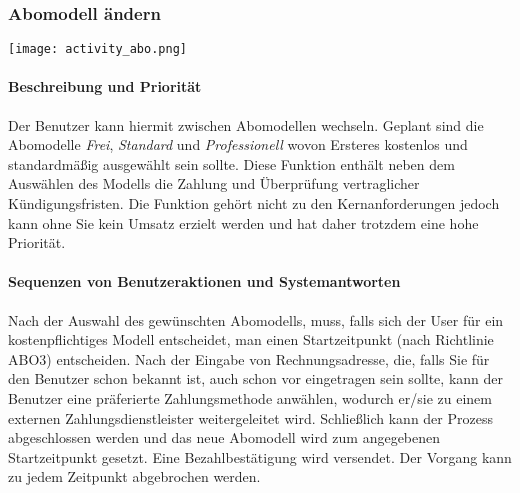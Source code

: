 \subsubsection{Abomodell ändern}
\texttt{[image: activity\_abo.png]}


\paragraph{Beschreibung und Priorität}
Der Benutzer kann hiermit zwischen Abomodellen wechseln. Geplant sind die Abomodelle \textit{Frei}, \textit{Standard} und \textit{Professionell} wovon Ersteres kostenlos und standardmäßig ausgewählt sein sollte. Diese Funktion enthält neben dem Auswählen des Modells die Zahlung und Überprüfung vertraglicher Kündigungsfristen. Die Funktion gehört nicht zu den Kernanforderungen jedoch kann ohne Sie kein Umsatz erzielt werden und hat daher trotzdem eine hohe Priorität.
\paragraph{Sequenzen von Benutzeraktionen und Systemantworten}
Nach der Auswahl des gewünschten Abomodells, muss, falls sich der User für ein kostenpflichtiges Modell entscheidet, man einen Startzeitpunkt (nach Richtlinie ABO3) entscheiden. Nach der Eingabe von Rechnungsadresse, die, falls Sie für den Benutzer schon bekannt ist, auch schon vor eingetragen sein sollte, kann der Benutzer eine präferierte Zahlungsmethode anwählen, wodurch er/sie zu einem externen Zahlungsdienstleister weitergeleitet wird. Schließlich kann der Prozess abgeschlossen werden und das neue Abomodell wird zum angegebenen Startzeitpunkt gesetzt. Eine Bezahlbestätigung wird versendet. Der Vorgang kann zu jedem Zeitpunkt abgebrochen werden.

